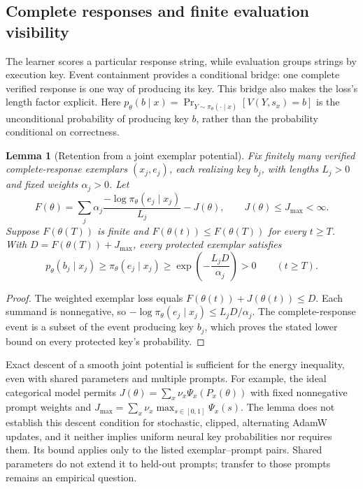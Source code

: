 \documentclass{article}
\newcommand{\enforcehalffinalproseline}{%
  \setlength{\parfillskip}{0pt plus .20\linewidth}}
\newcommand{\1}{\mathbf 1}
\newtheorem{lemma}{Lemma}[section]
\theoremstyle{remark}
\theoremstyle{definition}
\theoremstyle{plain}
\begin{document}
\subsection{Complete responses and finite evaluation visibility}
\label{app:theory-exemplar-bridge}

The learner scores a particular response string, while evaluation groups
strings by execution key. Event containment provides a conditional bridge:
one complete verified response is one way of producing its key. This bridge
also makes the loss's length factor explicit. Here
$p_\theta(b\mid x)=\Pr_{Y\sim\pi_\theta(\cdot\mid x)}[V(Y,s_x)=b]$
is the unconditional probability of producing key $b$, rather than the
probability conditional on correctness.

\begin{lemma}[Retention from a joint exemplar potential]
\enforcehalffinalproseline
\label{lem:shared-exemplar-retention}
Fix finitely many verified complete-response exemplars $(x_j,e_j)$, each
realizing key $b_j$, with lengths $L_j>0$ and fixed weights $\alpha_j>0$.
Let
\[
 F(\theta)=\sum_j\alpha_j
 \frac{-\log\pi_\theta(e_j\mid x_j)}{L_j}-J(\theta),
 \qquad J(\theta)\le J_{\max}<\infty.
\]
Suppose $F(\theta(T))$ is finite and
$F(\theta(t))\le F(\theta(T))$ for every $t\ge T$. With
$D=F(\theta(T))+J_{\max}$, every protected exemplar satisfies
\[
 p_\theta(b_j\mid x_j)\ge\pi_\theta(e_j\mid x_j)
 \ge\exp\!\left(-\frac{L_jD}{\alpha_j}\right)>0
 \qquad(t\ge T).
\]
\end{lemma}
\begin{proof}
\enforcehalffinalproseline
The weighted exemplar loss equals $F(\theta(t))+J(\theta(t))\le D$.
Each summand is nonnegative, so
$-\log\pi_\theta(e_j\mid x_j)\le L_jD/\alpha_j$.
The complete-response event is a subset of the event producing key $b_j$,
which proves the stated lower bound on every protected key's probability.
\end{proof}

Exact descent of a smooth joint potential is sufficient for the energy
inequality, even with shared parameters and multiple prompts. For example,
the ideal categorical model permits
$J(\theta)=\sum_x\nu_x\Psi_x(P_x(\theta))$ with fixed nonnegative prompt
weights and $J_{\max}=\sum_x\nu_x\max_{s\in[0,1]}\Psi_x(s)$. The lemma does not establish
this descent condition for stochastic, clipped, alternating AdamW updates,
and it neither implies uniform neural key probabilities nor requires them.
Its bound applies only to the listed exemplar--prompt pairs. Shared
parameters do not extend it to held-out prompts; transfer to those prompts
remains an empirical question.
\end{document}
